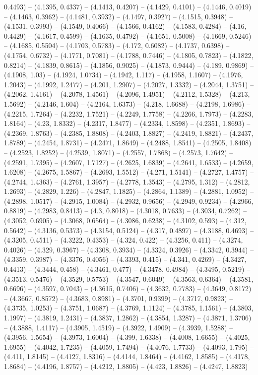 0.4493) -- (4.1395, 0.4337) -- (4.1413, 0.4207) -- (4.1429, 0.4101) -- (4.1446, 0.4019) -- (4.1463, 0.3962) -- (4.1481, 0.3932) -- (4.1497, 0.3927) -- (4.1515, 0.3948) -- (4.1531, 0.3993) -- (4.1549, 0.4066) -- (4.1566, 0.4162) -- (4.1583, 0.4284) -- (4.16, 0.4429) -- (4.1617, 0.4599) -- (4.1635, 0.4792) -- (4.1651, 0.5008) -- (4.1669, 0.5246) -- (4.1685, 0.5504) -- (4.1703, 0.5783) -- (4.172, 0.6082) -- (4.1737, 0.6398) -- (4.1754, 0.6732) -- (4.1771, 0.7081) -- (4.1788, 0.7446) -- (4.1805, 0.7823) -- (4.1822, 0.8214) -- (4.1839, 0.8615) -- (4.1856, 0.9025) -- (4.1873, 0.9444) -- (4.189, 0.9869) -- (4.1908, 1.03) -- (4.1924, 1.0734) -- (4.1942, 1.117) -- (4.1958, 1.1607) -- (4.1976, 1.2043) -- (4.1992, 1.2477) -- (4.201, 1.2907) -- (4.2027, 1.3332) -- (4.2044, 1.3751) -- (4.2062, 1.4161) -- (4.2078, 1.4561) -- (4.2096, 1.4951) -- (4.2112, 1.5328) -- (4.213, 1.5692) -- (4.2146, 1.604) -- (4.2164, 1.6373) -- (4.218, 1.6688) -- (4.2198, 1.6986) -- (4.2215, 1.7264) -- (4.2232, 1.7521) -- (4.2249, 1.7758) -- (4.2266, 1.7973) -- (4.2283, 1.8164) -- (4.23, 1.8332) -- (4.2317, 1.8477) -- (4.2334, 1.8598) -- (4.2351, 1.8693) -- (4.2369, 1.8763) -- (4.2385, 1.8808) -- (4.2403, 1.8827) -- (4.2419, 1.8821) -- (4.2437, 1.8789) -- (4.2454, 1.8731) -- (4.2471, 1.8649) -- (4.2488, 1.8541) -- (4.2505, 1.8408) -- (4.2523, 1.8252) -- (4.2539, 1.8071) -- (4.2557, 1.7868) -- (4.2573, 1.7642) -- (4.2591, 1.7395) -- (4.2607, 1.7127) -- (4.2625, 1.6839) -- (4.2641, 1.6533) -- (4.2659, 1.6208) -- (4.2675, 1.5867) -- (4.2693, 1.5512) -- (4.271, 1.5141) -- (4.2727, 1.4757) -- (4.2744, 1.4363) -- (4.2761, 1.3957) -- (4.2778, 1.3543) -- (4.2795, 1.312) -- (4.2812, 1.2693) -- (4.2829, 1.226) -- (4.2847, 1.1825) -- (4.2864, 1.1389) -- (4.2881, 1.0952) -- (4.2898, 1.0517) -- (4.2915, 1.0084) -- (4.2932, 0.9656) -- (4.2949, 0.9234) -- (4.2966, 0.8819) -- (4.2983, 0.8413) -- (4.3, 0.8018) -- (4.3018, 0.7633) -- (4.3034, 0.7262) -- (4.3052, 0.6905) -- (4.3068, 0.6564) -- (4.3086, 0.6238) -- (4.3102, 0.593) -- (4.312, 0.5642) -- (4.3136, 0.5373) -- (4.3154, 0.5124) -- (4.317, 0.4897) -- (4.3188, 0.4693) -- (4.3205, 0.4511) -- (4.3222, 0.4353) -- (4.324, 0.422) -- (4.3256, 0.411) -- (4.3274, 0.4026) -- (4.329, 0.3967) -- (4.3308, 0.3934) -- (4.3324, 0.3926) -- (4.3342, 0.3944) -- (4.3359, 0.3987) -- (4.3376, 0.4056) -- (4.3393, 0.415) -- (4.341, 0.4269) -- (4.3427, 0.4413) -- (4.3444, 0.458) -- (4.3461, 0.477) -- (4.3478, 0.4984) -- (4.3495, 0.5219) -- (4.3513, 0.5476) -- (4.3529, 0.5753) -- (4.3547, 0.6049) -- (4.3563, 0.6364) -- (4.3581, 0.6696) -- (4.3597, 0.7043) -- (4.3615, 0.7406) -- (4.3632, 0.7783) -- (4.3649, 0.8172) -- (4.3667, 0.8572) -- (4.3683, 0.8981) -- (4.3701, 0.9399) -- (4.3717, 0.9823) -- (4.3735, 1.0253) -- (4.3751, 1.0687) -- (4.3769, 1.1124) -- (4.3785, 1.1561) -- (4.3803, 1.1997) -- (4.3819, 1.2431) -- (4.3837, 1.2862) -- (4.3854, 1.3287) -- (4.3871, 1.3706) -- (4.3888, 1.4117) -- (4.3905, 1.4519) -- (4.3922, 1.4909) -- (4.3939, 1.5288) -- (4.3956, 1.5654) -- (4.3973, 1.6004) -- (4.399, 1.6338) -- (4.4008, 1.6655) -- (4.4025, 1.6955) -- (4.4042, 1.7235) -- (4.4059, 1.7494) -- (4.4076, 1.7733) -- (4.4093, 1.795) -- (4.411, 1.8145) -- (4.4127, 1.8316) -- (4.4144, 1.8464) -- (4.4162, 1.8585) -- (4.4178, 1.8684) -- (4.4196, 1.8757) -- (4.4212, 1.8805) -- (4.423, 1.8826) -- (4.4247, 1.8823) 
